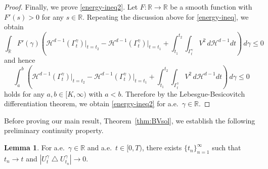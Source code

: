 \documentclass{amsart}
\theoremstyle{definition}
\newtheorem{lemma}[definition]{Lemma}
\def\R{{\mathbb{R}}}
\begin{document}
\begin{proof}
Finally, we prove \eqref{energy-ineq2}. 
Let $F :\R\to \R$ be a smooth function with $F' (s) >0$ for any $s \in \R$.
Repeating the discussion above for \eqref{energy-ineq}, we obtain
\[
\int_\R F' (\gamma) 
\left(
\mathcal{H}^{d-1}(\Gamma _t ^\gamma) 
\Big | _{t=t_2}
-
\mathcal{H}^{d-1}(\Gamma _t ^\gamma) 
\Big | _{t=t_1}
+
\int_{t_1} ^{t_2} \int_{\Gamma _t ^\gamma} V^2 \, d\mathcal{H}^{d-1} dt 
\right) \, d\gamma \leq 0
\]
and hence
\[
\int_a ^b  
\left(
\mathcal{H}^{d-1}(\Gamma _t ^\gamma) 
\Big | _{t=t_2}
-
\mathcal{H}^{d-1}(\Gamma _t ^\gamma) 
\Big | _{t=t_1}
+
\int_{t_1} ^{t_2} \int_{\Gamma _t ^\gamma} V^2 \, d\mathcal{H}^{d-1} dt 
\right) \, d\gamma \leq 0
\]
holds for any $a,b \in [K,\infty)$ with $a<b$.
Therefore by the Lebesgue-Besicovitch differentiation theorem, we obtain \eqref{energy-ineq2} for a.e.\ $\gamma \in \R$.
\end{proof}

Before proving our main result, Theorem~\ref{thm:BVsol}, we establish the following preliminary continuity property.
\begin{lemma}\label{lemma3.9}
For a.e.\ $\gamma \in \R$ and a.e.\ $t \in [0,T)$, there exists $\{ t_n\}_{n=1} ^\infty$ such that $t_n \to t$ and $|U_t ^\gamma \bigtriangleup U_{t_n} ^\gamma| \to 0$.
\end{lemma}
\end{document}
